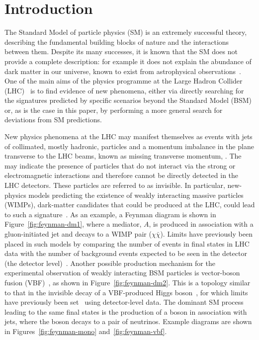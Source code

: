 \documentclass[cernpreprint,txfonts,UKenglish,texlive=2016]{\ATLASLATEXPATH atlasdoc}
\begin{document}
\maketitle

\newcommand{\comment}[1]{\ding{110}\ding{43}\textcolor{blue}{Comment: #1}}
\newcommand{\todo}[1]{\ding{110}\ding{43}\textcolor{red}{TODO: #1}}
 \newcommand{\ifprefchar}{\ifpunctmark{'}}

\section{Introduction}
\label{sec:introduction}
The Standard Model of particle physics (SM) is an extremely successful
theory, describing the fundamental building blocks of nature and the
interactions between them. Despite
its many successes, it is
known that the SM does not provide a complete description: for example it does not
explain the abundance of dark matter in our universe, known to exist from astrophysical observations~\cite{Bertone:2004pz,deSwart:2017heh,Conrad:2017pms}.
One of the main aims of the physics programme at the Large Hadron Collider
(LHC)~\cite{Evans:2008zzb}  is to find evidence of new phenomena,
either via directly searching for the
signatures predicted by specific scenarios beyond the Standard Model (BSM) or, as is the case in this paper,
by performing a more general search for deviations from SM predictions.

New physics phenomena at the LHC may manifest themselves as events with
jets of collimated, mostly hadronic, particles and a momentum
imbalance in the plane transverse to the LHC beams, known as missing
transverse momentum, \ptmiss. The \ptmiss{} may indicate the
presence of particles that do not interact via the strong or
electromagnetic interactions and therefore cannot be directly detected
in the LHC detectors. These particles are referred to as invisible. 
In particular, new-physics models 
predicting the existence of weakly interacting massive particles (WIMPs), dark-matter candidates that could be produced at the LHC,
could lead to such a signature~\cite{Abdallah:2015ter}. As an example, a
Feynman diagram is shown in Figure~\ref{fig:feynman-dm1}, where a
mediator, $A$, is produced in association with a gluon-initiated jet and decays to a WIMP pair ($\chi\bar{\chi}$).
Limits have previously been placed in such models by comparing the number of events in \ptmissjet{}
final states in LHC data with the number of background events expected to be seen in the 
detector (the detector level)~\cite{EXOT-2015-03,CMS-EXO-12-048}.
Another possible production mechanism for the experimental
observation of weakly interacting BSM particles is vector-boson fusion
(VBF)~\cite{Cotta:2012nj}, as shown in
Figure~\ref{fig:feynman-dm2}. This is a topology similar to that
in the invisible decay of a VBF-produced Higgs
boson~\cite{Shrock:1982kd,Choudhury:1993hv,Eboli:2000ze}, for which
limits have previously been
set~\cite{HIGG-2013-16,Khachatryan:2016whc} using detector-level data.
The dominant SM process leading to the same final states is
the production of a \Z{} boson in association with jets,
where the \Z{} boson decays to a pair of neutrinos. Example diagrams
are shown in Figures~\ref{fig:feynman-mono} and~\ref{fig:feynman-vbf}.
\end{document}
